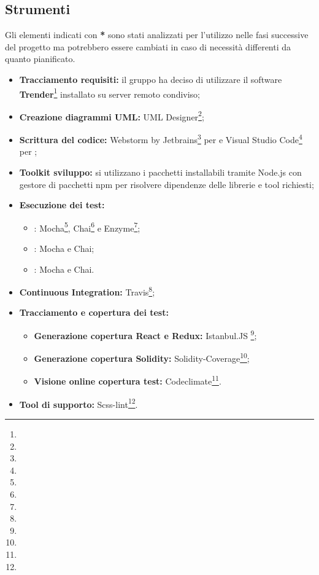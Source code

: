\documentclass[NormeDiProgetto.tex]{subfiles}
\begin{document}
\subsection{Strumenti}
Gli elementi indicati con \textbf{*} sono stati analizzati per l'utilizzo nelle fasi successive del progetto ma potrebbero essere cambiati in caso di necessità differenti da quanto pianificato.
\begin{itemize}
	\item \textbf{Tracciamento requisiti:} il gruppo \gruppo ha deciso di utilizzare il software \textbf{Trender}\footnote{} installato su server remoto condiviso;
	\item \textbf{Creazione diagrammi UML:} {UML Designer}\footnote{};
	\item \textbf{Scrittura del codice:} Webstorm by Jetbrains\footnote{} per  e Visual Studio Code\footnote{} per ; 
	\item \textbf{Toolkit sviluppo:} si utilizzano i pacchetti installabili tramite Node.js con gestore di pacchetti npm per risolvere dipendenze delle librerie e tool richiesti;
	\item \textbf{Esecuzione dei test:}
	\begin{itemize}
		\item {}: Mocha\footnote{}, Chai\footnote{} e Enzyme\footnote{};
		\item {}: Mocha e Chai;
		\item {}: Mocha e Chai.
	\end{itemize}
	\item \textbf{Continuous Integration:} Travis\footnote{};
	\item \textbf{Tracciamento e copertura dei test:} 
	\begin{itemize}
		\item \textbf{Generazione copertura React e Redux:} Istanbul.JS \footnote{};
		\item \textbf{Generazione copertura Solidity:} Solidity-Coverage\footnote{};
		\item \textbf{Visione online copertura test:} Codeclimate\footnote{}.
	\end{itemize}
	\item \textbf{Tool di supporto:} Scss-lint\footnote{}. 	
\end{itemize}
\end{document}
